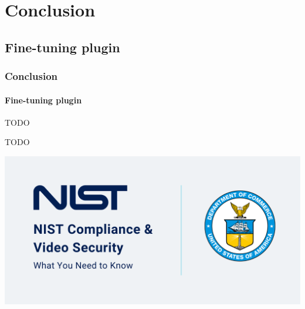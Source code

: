 \def\sectiontitle{Conclusion}

\section{\sectiontitle}

\def\slidetitle{Fine-tuning plugin}

\subsection{\slidetitle}
\begin{frame}
  \frametitle{\sectiontitle}
  \framesubtitle{\slidetitle}

  \begin{minipage}[h!]{0.65\textwidth}
    TODO

    TODO

  \end{minipage}\hfill
  \begin{minipage}[h!]{0.35\textwidth}
    \includegraphics[scale=0.55]{./img/example-image.png}
  \end{minipage}
\end{frame}